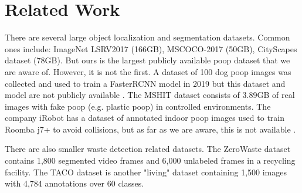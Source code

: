\documentclass[10pt,twocolumn,letterpaper]{article}
\begin{document}




\section{Related Work}
\label{sec:relatedwork}

There are several large object localization and segmentation datasets.
Common ones include:
ImageNet LSRV2017 \cite{ILSVRC15} (166GB), MSCOCO-2017 \cite{lin_microsoft_2014} (50GB), CityScapes dataset
  \cite{cordts2015cityscapes} (78GB).
But ours is the largest publicly available poop dataset that we are aware of.
However, it is not the first.
A dataset of 100 dog poop images was collected and used to train a FasterRCNN model in 2019 but this dataset
  and model are not publicly available \cite{neeraj_madan_dog_2019}.
The MSHIT dataset \cite{mshit_2020} consists of 3.89GB of real images with fake poop (e.g.
plastic poop) in controlled environments.
The company iRobot has a dataset of annotated indoor poop images used to train Roomba j7+ to avoid
  collisions, but as far as we are aware, this is not available \cite{roomba_2021}.

There are also smaller waste detection related datasets.
The ZeroWaste dataset \cite{bashkirova_zerowaste_2022} contains 1,800 segmented
video frames and 6,000 unlabeled frames in a recycling facility.
The TACO dataset \cite{proenca_taco_2020} is another "living" dataset
containing 1,500 images with 4,784 annotations over 60 classes.
\end{document}
